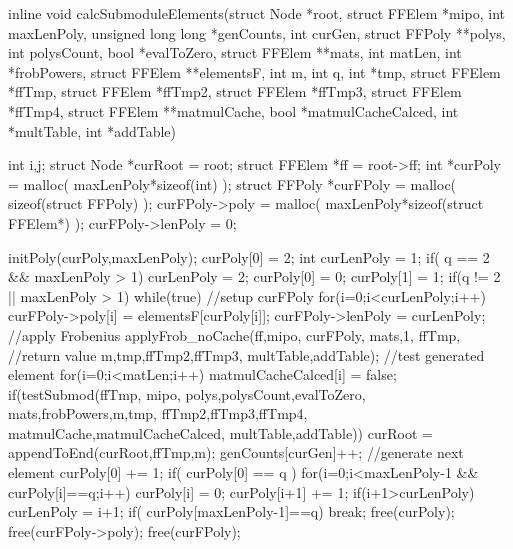\begin{ccode}[caption={Aus \url{../Sage/enumeratePCNs.c}},
  label=lst:calcSubmoduleElements]
inline void calcSubmoduleElements(struct Node *root,
        struct FFElem *mipo,
        int maxLenPoly, 
        unsigned long long *genCounts, int curGen,
        struct FFPoly **polys, int polysCount, bool *evalToZero,
        struct FFElem **mats, int matLen, int *frobPowers,
        struct FFElem **elementsF,
        int m, int q, int *tmp,
        struct FFElem *ffTmp, struct FFElem *ffTmp2, struct FFElem *ffTmp3, 
        struct FFElem *ffTmp4,
        struct FFElem **matmulCache, bool *matmulCacheCalced,
        int *multTable, int *addTable){
    int i,j;
    struct Node *curRoot = root;
    struct FFElem *ff = root->ff;
    int *curPoly = malloc( maxLenPoly*sizeof(int) );
    struct FFPoly *curFPoly = malloc( sizeof(struct FFPoly) );
    curFPoly->poly = malloc( maxLenPoly*sizeof(struct FFElem*) );
    curFPoly->lenPoly = 0;
    
    initPoly(curPoly,maxLenPoly);
    curPoly[0] = 2;
    int curLenPoly = 1;
    if( q == 2 && maxLenPoly > 1){
        curLenPoly = 2;
        curPoly[0] = 0;
        curPoly[1] = 1;
    }
    if(q != 2 || maxLenPoly > 1){
        while(true){
            //setup curFPoly
            for(i=0;i<curLenPoly;i++)
                curFPoly->poly[i] = elementsF[curPoly[i]];
            curFPoly->lenPoly = curLenPoly;
            //apply Frobenius
            applyFrob_noCache(ff,mipo,
                    curFPoly,
                    mats,1, ffTmp, //return value
                    m,tmp,ffTmp2,ffTmp3,
                    multTable,addTable);
            //test generated element
            for(i=0;i<matLen;i++) matmulCacheCalced[i] = false;
            if(testSubmod(ffTmp, mipo,
                    polys,polysCount,evalToZero,
                    mats,frobPowers,m,tmp,
                    ffTmp2,ffTmp3,ffTmp4,
                    matmulCache,matmulCacheCalced, multTable,addTable)){
                curRoot = appendToEnd(curRoot,ffTmp,m);
                genCounts[curGen]++;
            }
            //generate next element
            curPoly[0] += 1;
            if( curPoly[0] == q ){
                for(i=0;i<maxLenPoly-1 && curPoly[i]==q;i++){
                    curPoly[i] = 0;
                    curPoly[i+1] += 1;
                }
                if(i+1>curLenPoly)
                    curLenPoly = i+1;
                if( curPoly[maxLenPoly-1]==q){
                    break;
                }
            }
        }
    }
    free(curPoly);
    free(curFPoly->poly);
    free(curFPoly);
}
\end{ccode}

